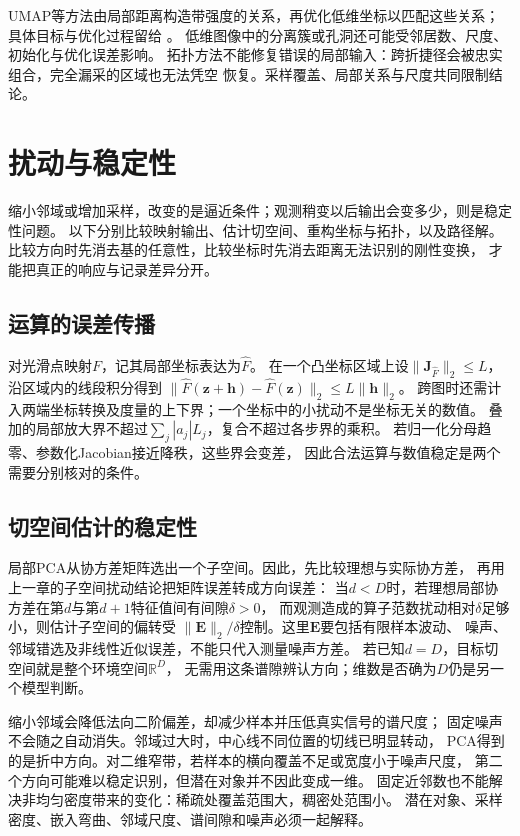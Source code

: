 UMAP等方法由局部距离构造带强度的关系，再优化低维坐标以匹配这些关系；
具体目标与优化过程留给
。
低维图像中的分离簇或孔洞还可能受邻居数、尺度、初始化与优化误差影响。
拓扑方法不能修复错误的局部输入：跨折捷径会被忠实组合，完全漏采的区域也无法凭空
恢复。采样覆盖、局部关系与尺度共同限制结论。

\section{扰动与稳定性}
\label{sec:geometry-stability}

缩小邻域或增加采样，改变的是逼近条件；观测稍变以后输出会变多少，则是稳定性问题。
以下分别比较映射输出、估计切空间、重构坐标与拓扑，以及路径解。
比较方向时先消去基的任意性，比较坐标时先消去距离无法识别的刚性变换，
才能把真正的响应与记录差异分开。

\subsection{运算的误差传播}
\label{sec:geometry-operation-stability}

对光滑点映射$F$，记其局部坐标表达为$\widehat F$。
在一个凸坐标区域上设$\lVert\bm J_{\widehat F}\rVert_2\leq L$，
沿区域内的线段积分得到
$\lVert\widehat F(\bm z+\bm h)-\widehat F(\bm z)\rVert_2
\leq L\lVert\bm h\rVert_2$。
跨图时还需计入两端坐标转换及度量的上下界；一个坐标中的小扰动不是坐标无关的数值。
叠加的局部放大界不超过$\sum_j|a_j|L_j$，复合不超过各步界的乘积。
若归一化分母趋零、参数化Jacobian接近降秩，这些界会变差，
因此合法运算与数值稳定是两个需要分别核对的条件。

\subsection{切空间估计的稳定性}
\label{sec:geometry-tangent-estimate-stability}

局部PCA从协方差矩阵选出一个子空间。因此，先比较理想与实际协方差，
再用上一章的子空间扰动结论把矩阵误差转成方向误差：
当$d<D$时，若理想局部协方差在第$d$与第$d+1$特征值间有间隙$\delta>0$，
而观测造成的算子范数扰动相对$\delta$足够小，则估计子空间的偏转受
$\lVert\bm E\rVert_2/\delta$控制。这里$\bm E$要包括有限样本波动、
噪声、邻域错选及非线性近似误差，不能只代入测量噪声方差。
若已知$d=D$，目标切空间就是整个环境空间$\mathbb R^D$，
无需用这条谱隙辨认方向；维数是否确为$D$仍是另一个模型判断。

缩小邻域会降低法向二阶偏差，却减少样本并压低真实信号的谱尺度；
固定噪声不会随之自动消失。邻域过大时，中心线不同位置的切线已明显转动，
PCA得到的是折中方向。对二维窄带，若样本的横向覆盖不足或宽度小于噪声尺度，
第二个方向可能难以稳定识别，但潜在对象并不因此变成一维。
固定近邻数也不能解决非均匀密度带来的变化：稀疏处覆盖范围大，稠密处范围小。
潜在对象、采样密度、嵌入弯曲、邻域尺度、谱间隙和噪声必须一起解释。


